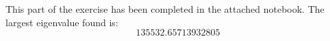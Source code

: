 This part of the exercise has been completed in the attached notebook. The largest eigenvalue found is:
$$
135532.65713932805
$$
